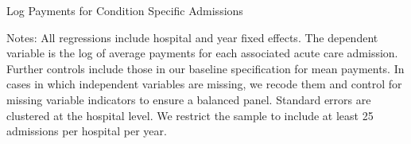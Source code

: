 \documentclass[12pt]{article}
\begin{document}
\setlength{\captionmargin}{.5 \textwidth} \addtolength{\captionmargin}{-.5\wd\gfxbox}
\begin{table}[htbp!]
\centering
\caption{Log Payments for Condition Specific Admissions}
\label{tab:eachcondition}
\usebox{\gfxbox}
\par
\begin{minipage}{\wd\gfxbox}
\footnotesize
Notes: All regressions include hospital and year fixed effects.  The dependent variable is the log of average payments for each associated acute care admission.  Further controls include those in our baseline specification for mean payments.  In cases in which independent variables are missing, we recode them and control for missing variable indicators to ensure a balanced panel.  Standard errors are clustered at the hospital level.  We restrict the sample to include at least 25 admissions per hospital per year.
\end{minipage}
\end{table}
\end{document}
